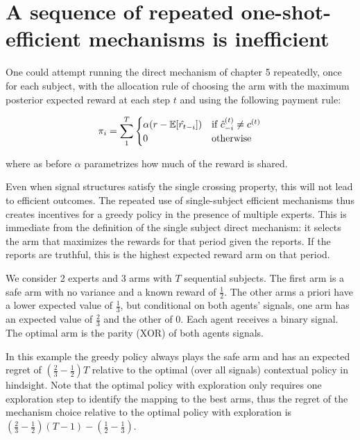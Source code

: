 \section{A sequence of repeated one-shot-efficient mechanisms is inefficient}

One could attempt running the direct mechanism of chapter 5 repeatedly, once for each subject, with the allocation rule of choosing the arm with the maximum posterior expected reward at each step $t$ and using the following payment rule:

\[
    \pi_i = \sum_1^T 
\begin{cases}
   \alpha (r - \operatorname*{\mathbb E}[\hat{r_{t}}_{-i}]) & \text{if } \hat{c}^{(t)}_{-i} \neq c^{(t)}\\
    0              & \text{otherwise}
\end{cases}
\]

where as before $\alpha$ parametrizes how much of the reward is shared. 

Even when signal structures satisfy the single crossing property, this will not lead to efficient outcomes.
The repeated use of single-subject efficient mechanisms thus creates incentives for a greedy policy in the presence of multiple experts.
This is immediate from the definition of the single subject direct mechanism: it selects the arm that maximizes the rewards for that period given the reports. If the reports are truthful, this is the highest expected reward arm on that period.


\begin{eg}\label{eg:2regimes}
   We consider 2 experts and 3 arms with $T$ sequential subjects. The first arm is a safe arm with no variance and a known reward of $\frac{1}{2}$. The other arms a priori have a lower expected value of $\frac{1}{3}$, but conditional on both agents' signals, one arm has an expected value of $\frac{2}{3}$ and the other of $0$. 
Each agent receives a binary signal. The optimal arm is the parity (XOR) of both agents signals. 
\end{eg}

In this example the greedy policy always plays the safe arm and has an expected regret of $\left(\frac{2}{3} - \frac{1}{2}\right)T$ relative to the optimal (over all signals) contextual policy in hindsight.
Note that the optimal policy with exploration only requires one exploration step to identify the mapping to the best arms, thus the regret of the mechanism choice  relative to the optimal policy with exploration is $\left(\frac{2}{3} - \frac{1}{2}\right)(T-1) - \left(\frac{1}{2} - \frac{1}{3}\right)$.


